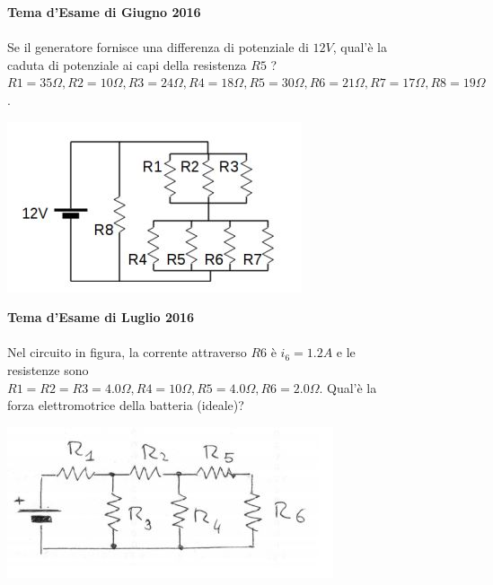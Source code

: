 \begin{figure}[h!]
\textbf{Tema d'Esame di Giugno 2016}\\ \\
Se il generatore fornisce una differenza di potenziale di $12 V$, qual'è la caduta di potenziale ai capi della resistenza $R5$ ?
$R1= 35 \Omega, R2= 10 \Omega, R3= 24 \Omega, R4= 18 \Omega, R5= 30 \Omega, R6= 21 \Omega, R7=17 \Omega , R8=19 \Omega$.
\begin{center}
		\includegraphics[scale=1]{ES5/GIU052016.jpg}
	\end{center}
\end{figure}

\begin{figure}[h!]
\textbf{Tema d'Esame di Luglio 2016}\\ \\
Nel circuito in figura, la corrente attraverso $R6$ è $i_6=1.2 A$ e le resistenze sono $R1=R2=R3=4.0 \Omega, R4= 10 \Omega, R5= 4.0 \Omega , R6= 2.0 \Omega$. Qual'è la forza elettromotrice della batteria (ideale)?
\begin{center}
		\includegraphics[scale=0.8]{ES5/LUG052016.jpg}
	\end{center}
\end{figure}